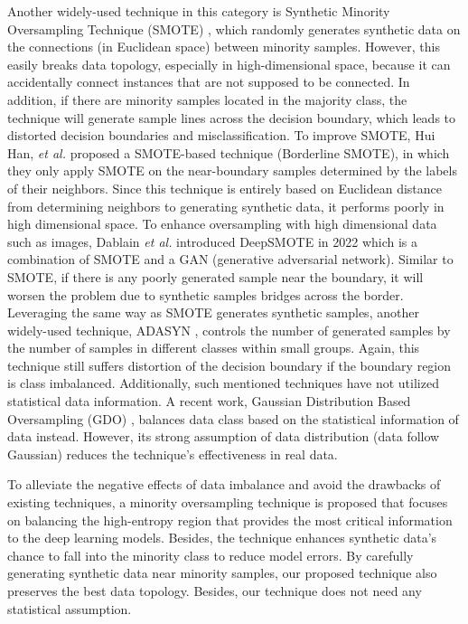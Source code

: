 \documentclass[journal]{IEEEtai}
\begin{document}
Another widely-used technique in this category is Synthetic Minority Oversampling Technique (SMOTE) \cite{chawla_smote:_2002}, which randomly generates synthetic data on the connections (in Euclidean space) between minority samples. However, this easily breaks data topology, especially in high-dimensional space, because it can accidentally connect instances that are not supposed to be connected. In addition, if there are minority samples located in the majority class, the technique will generate sample lines across the decision boundary, which leads to distorted decision boundaries and misclassification. To improve SMOTE, Hui Han, \textit{et al.} \cite{bordersmote} proposed a SMOTE-based technique (Borderline SMOTE), in which they only apply SMOTE on the near-boundary samples determined by the labels of their neighbors. Since this technique is entirely based on Euclidean distance from determining neighbors to generating synthetic data, it performs poorly in high dimensional space. To enhance oversampling with high dimensional data such as images, Dablain \textit{et al.} introduced DeepSMOTE \cite{deepsmote} in 2022 which is a combination of SMOTE and a GAN (generative adversarial network). Similar to SMOTE, if there is any poorly generated sample near the boundary, it will worsen the problem due to synthetic samples bridges across the border. Leveraging the same way as SMOTE generates synthetic samples, another widely-used technique, ADASYN \cite{ADASYN}, controls the number of generated samples by the number of samples in different classes within small groups. Again, this technique still suffers distortion of the decision boundary if the boundary region is class imbalanced. Additionally, such mentioned techniques have not utilized statistical data information. A recent work, Gaussian Distribution Based Oversampling (GDO) \cite{bib:GDO}, balances data class based on the statistical information of data instead. However, its strong assumption of data distribution (data follow Gaussian) reduces the technique's effectiveness in real data.  

To alleviate the negative effects of data imbalance and avoid the drawbacks of existing techniques, a minority oversampling technique is proposed that focuses on balancing the high-entropy region that provides the most critical information to the deep learning models. Besides, the technique enhances synthetic data's chance to fall into the minority class to reduce model errors. By carefully generating synthetic data near minority samples, our proposed technique also preserves the best data topology. Besides, our technique does not need any statistical assumption. 
\end{document}
